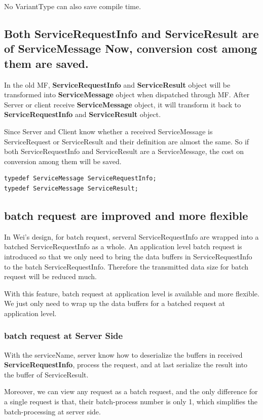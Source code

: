 \documentclass[a4paper,10pt]{article}
\begin{document}
No VariantType can also save compile time.


\subsection{Both ServiceRequestInfo and ServiceResult are of ServiceMessage Now, conversion cost among them are saved.}
In the old MF, \textbf{ServiceRequestInfo} and
\textbf{ServiceResult} object will be transformed into
\textbf{ServiceMessage} object when dispatched through MF. After
Server or client receive \textbf{ServiceMessage} object, it will
transform it back to \textbf{ServiceRequestInfo} and
\textbf{ServiceResult} object.

 
 Since Server and Client know  whether a
received ServiceMessage is ServiceRequest or ServiceResult and their
definition are almost the same. So if both ServiceRequestInfo and
ServiceResult are a ServiceMessage, the cost on conversion among
them  will be saved.
\begin{lstlisting}
typedef ServiceMessage ServiceRequestInfo;
typedef ServiceMessage ServiceResult;
\end{lstlisting}


\subsection{batch request are improved and more flexible}
 In Wei's design, for batch request,
serveral ServiceRequestInfo are wrapped into a batched ServiceRequestInfo as
a whole. An application level batch request is introduced so that we only need
to bring the data buffers in ServiceRequestInfo to the batch ServiceRequestInfo.
Therefore the transmitted data size for batch request will be reduced much.

With this feature, batch request at application level is available and more flexible.
We just only need to wrap up the data buffers for a batched request at application level.

\subsubsection{batch request at Server Side}
With  the serviceName, server know how to deserialize the buffers in
received \textbf{ServiceRequestInfo}, process the request, and at
last serialize the result into the buffer of ServiceResult.


Moreover, we can view any request as a batch request, and
the only difference for a single request is that, their
batch-process number is only 1, which simplifies the
batch-processing at server side.
\end{document}
